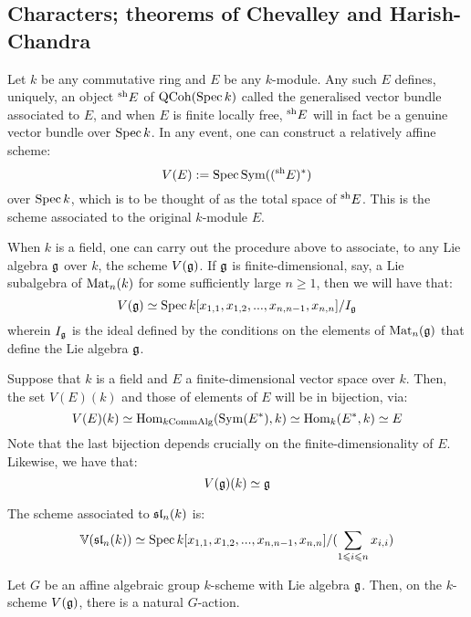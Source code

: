     \subsection{Characters; theorems of Chevalley and Harish-Chandra}
        \begin{convention}
            Let $k$ be any commutative ring and $E$ be any $k$-module. Any such $E$ defines, uniquely, an object ${}^{\sh}E$ of $\QCoh(\Spec k)$ called the generalised vector bundle associated to $E$, and when $E$ is finite locally free, ${}^{\sh}E$ will in fact be a genuine vector bundle over $\Spec k$. In any event, one can construct a relatively affine scheme:
                $$V(E) := \Spec \Sym(({}^{\sh}E)^*)$$
            over $\Spec k$, which is to be thought of as the total space of ${}^{\sh}E$. This is the scheme associated to the original $k$-module $E$. 

            When $k$ is a field, one can carry out the procedure above to associate, to any Lie algebra $\g$ over $k$, the scheme $V(\g)$. If $\g$ is finite-dimensional, say, a Lie subalgebra of $\Mat_n(k)$ for some sufficiently large $n \geq 1$, then we will have that:
                $$V(\g) \cong \Spec k[x_{1, 1}, x_{1, 2}, ..., x_{n, n - 1}, x_{n, n}]/I_{\g}$$
            wherein $I_{\g}$ is the ideal defined by the conditions on the elements of $\Mat_n(\g)$ that define the Lie algebra $\g$. 
        \end{convention}
        \begin{remark}
            Suppose that $k$ is a field and $E$ a finite-dimensional vector space over $k$. Then, the set $V(E)(k)$ and those of elements of $E$ will be in bijection, via:
                $$V(E)(k) \cong \Hom_{k\Comm\Alg}(\Sym(E^*), k) \cong \Hom_k(E^*, k) \cong E$$
            Note that the last bijection depends crucially on the finite-dimensionality of $E$. Likewise, we have that:
                $$V(\g)(k) \cong \g$$
        \end{remark}
        \begin{example}
            The scheme associated to $\sl_n(k)$ is:
                $$\V(\sl_n(k)) \cong \Spec k[x_{1, 1}, x_{1, 2}, ..., x_{n, n - 1}, x_{n, n}]/( \sum_{1 \leq i \leq n} x_{i, i} )$$
        \end{example}
        \begin{remark}
            Let $G$ be an affine algebraic group $k$-scheme with Lie algebra $\g$. Then, on the $k$-scheme $V(\g)$, there is a natural $G$-action. 
        \end{remark}

